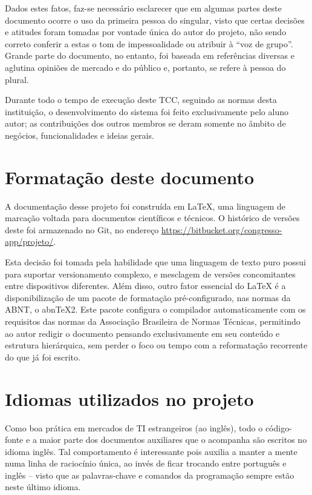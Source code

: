\documentclass[12pt,a4paper,twoside,hyphens,english,brazil]{abntex2}
\begin{document}
\begin{KeepFromToc}
Dados estes fatos, faz-se necessário esclarecer que em algumas partes deste documento ocorre o uso da primeira pessoa do singular, visto que certas decisões e atitudes foram tomadas por vontade única do autor do projeto, não sendo correto conferir a estas o tom de impessoalidade ou atribuir à ``voz de grupo''. Grande parte do documento, no entanto, foi baseada em referências diversas e aglutina opiniões de mercado e do público e, portanto, se refere à pessoa do plural.


Durante todo o tempo de execução deste TCC, seguindo as normas desta instituição, o desenvolvimento do sistema foi feito exclusivamente pelo aluno autor; as contribuições dos outros membros se deram somente no âmbito de negócios, funcionalidades e ideias gerais.

\section*{Formatação deste documento}
A documentação desse projeto foi construída em \LaTeX, uma linguagem de marcação voltada para documentos científicos e técnicos. O histórico de versões deste foi armazenado no Git, no endereço \url{https://bitbucket.org/congresso-app/projeto/}.

Esta decisão foi tomada pela habilidade que uma linguagem de texto puro possui para suportar versionamento complexo, e mesclagem de versões concomitantes entre dispositivos diferentes. Além disso, outro fator essencial do \LaTeX{} é a disponibilização de um pacote de formatação pré-configurado, nas normas da ABNT, o abn\TeX{}2\cite{abntex2}\cite{abntex2-slides}. Este pacote configura o compilador automaticamente com os requisitos das normas da Associação Brasileira de Normas Técnicas, permitindo ao autor redigir o documento pensando exclusivamente em seu conteúdo e estrutura hierárquica, sem perder o foco ou tempo com a reformatação recorrente do que já foi escrito.

\section*{Idiomas utilizados no projeto}
Como boa prática em mercados de TI estrangeiros (ao inglês), todo o código-fonte e a maior parte dos documentos auxiliares que o acompanha são escritos no idioma inglês. Tal comportamento é interessante pois auxilia a manter a mente numa linha de raciocínio única, ao invés de ficar trocando entre português e inglês -- visto que as palavras-chave e comandos da programação sempre estão neste último idioma.


\end{KeepFromToc}
\end{document}
